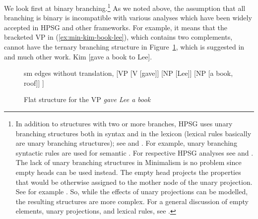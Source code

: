 \documentclass[output=paper
	        ,collection
	        ,collectionchapter
 	        ,biblatex
                ,babelshorthands
                ,newtxmath
                ,draftmode
                ,colorlinks, citecolor=brown
]{langscibook}
\begin{document}
We look first at binary branching.\footnote{
  In addition to structures with two or more branches, HPSG uses unary branching structures both in syntax
  and in the lexicon (lexical rules basically are unary branching structures); see
  \citet{Meurers2001a} and .
  For example, unary branching syntactic rules are used for semantic 
  \citep{Partee87a-u}. For respective HPSG analyses see  and
  . The lack of unary branching structures in Minimalism is
  no problem since empty heads can be used instead. The empty head projects the
  properties that would be otherwise assigned to the mother node of the unary projection. See for
  example . So, while the effects of unary projections can be
  modelled, the resulting structures are more complex. For a general discussion of empty elements,
  unary projections, and lexical rules, see .
% 
} As we noted above, the assumption that all branching is binary is incompatible with various
analyses which have been widely accepted in HPSG and other frameworks. For example, it means that
the bracketed VP in (\ref{ex:min-kim-book-lee}), which contains two complements, cannot have the
ternary branching structure in Figure~\ref{fig:gave-lee-book}, which is suggested in  and much other work.
\ea
Kim [gave a book to Lee].\label{ex:min-kim-book-lee}
\z
\begin{figure}
	\centering
	\begin{forest} sm edges without translation, 
		[VP
		[V [gave]] [NP [Lee]] [NP [a book, roof]]
		]
	\end{forest}
	\caption{\label{fig:gave-lee-book}Flat structure for the VP \emph{gave Lee a book}}
\end{figure}
\end{document}
